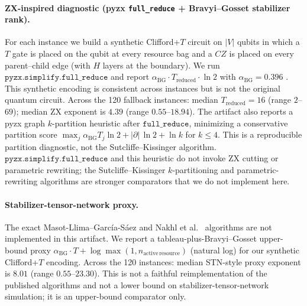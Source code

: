 \paragraph{ZX-inspired diagnostic (pyzx \texttt{full\_reduce} + Bravyi--Gosset stabilizer rank).}
For each instance we build a synthetic Clifford+\(T\) circuit on \(|V|\) qubits in which a \(T\) gate is placed on the qubit at every resource bag and a \(CZ\) is placed on every parent--child edge (with \(H\) layers at the boundary). We run \(\mathtt{pyzx.simplify.full\_reduce}\) and report \(\alpha_{\mathrm{BG}}\cdot T_{\mathrm{reduced}}\cdot\ln 2\) with \(\alpha_{\mathrm{BG}}=0.396\) \citep{BravyiGosset2016}. This synthetic encoding is consistent across instances but is not the original quantum circuit. Across the 120 fallback instances: median \(T_{\mathrm{reduced}}=16\) (range \(2\)--\(69\)); median ZX exponent is \(4.39\) (range \(0.55\)--\(18.94\)). The artifact also reports a pyzx graph \(k\)-partition heuristic after \(\mathtt{full\_reduce}\), minimizing a conservative partition score \(\max_j \alpha_{\mathrm{BG}}T_j\ln2 + |\partial|\,\ln2+\ln k\) for \(k\le4\). This is a reproducible partition diagnostic, not the Sutcliffe--Kissinger algorithm. \(\mathtt{pyzx.simplify.full\_reduce}\) and this heuristic do not invoke ZX cutting or parametric rewriting; the Sutcliffe--Kissinger \(k\)-partitioning and parametric-rewriting algorithms \citep{Sutcliffe2024KPartition,SutcliffeKissinger2024Cutting,SutcliffeKissinger2025Parametric} are stronger comparators that we do not implement here.

\paragraph{Stabilizer-tensor-network proxy.}
The exact Masot-Llima--Garc\'ia-S\'aez \citep{MasotLlimaGarciaSaez2024} and Nakhl et al.\ \citep{NakhlEtAl2025} algorithms are not implemented in this artifact. We report a tableau-plus-Bravyi--Gosset upper-bound proxy \(\alpha_{\mathrm{BG}}\cdot T+\log\max(1,n_{\mathrm{active\,resource}})\) (natural log) for our synthetic Clifford+\(T\) encoding. Across the 120 instances: median STN-style proxy exponent is \(8.01\) (range \(0.55\)--\(23.30\)). This is not a faithful reimplementation of the published algorithms and not a lower bound on stabilizer-tensor-network simulation; it is an upper-bound comparator only.

